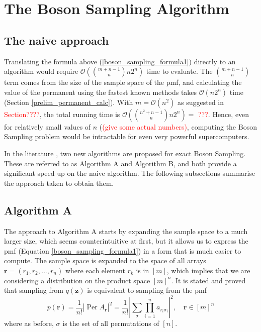 \documentclass[11pt]{article}
\theoremstyle{theorem}
\theoremstyle{remark}
\theoremstyle{plain}
\theoremstyle{definition}
\DeclareMathOperator*{\Per}{\mathrm{Per}}
\begin{document}
\section{The Boson Sampling Algorithm}
\subsection{The naive approach}
Translating the formula above (\ref{boson_sampling_formula1}) directly to an algorithm would require $\mathcal{O}(\binom{m+n-1}{n} n 2^n)$ time to evaluate. The $\binom{m+n-1}{n}$ term comes from the size of the sample space of the pmf, and calculating the value of the permanent using the fastest known methods takes $\mathcal{O}(n 2^n)$ time (Section \ref{prelim_permanent_calc}). With $m = \mathcal{O}(n^2)$ as suggested in \textcolor{red}{Section????}, the total running time is $\mathcal{O}(\binom{n^2+n-1}{n} n 2^n) = $ \textcolor{red}{???}. Hence, even for relatively small values of $n$ (\textcolor{red}{(give some actual numbers)}, computing the Boson Sampling problem would be intractable for even very powerful supercomputers.

In the literature \cite{clifford17}, two new algorithms are proposed for exact Boson Sampling. These are referred to as Algorithm A and Algorithm B, and both provide a significant speed up on the naive algorithm. The following subsections summarise the approach taken to obtain them.

\subsection{Algorithm A}
The approach to Algorithm A starts by expanding the sample space to a much larger size, which seems counterintuitive at first, but it allows us to express the pmf (Equation \ref{boson_sampling_formula1}) in a form that is much easier to compute. The sample space is expanded to the space of all arrays $\mathbf{r}=(r_1, r_2, ... , r_n)$ where each element $r_k$ is in $[m]$, which implies that we are considering a distribution on the product space $[m]^n$. It is stated and proved that sampling from $q(\mathbf{z})$ is equivalent to sampling from the pmf
\begin{equation} \label{eqn:algADistribution}
p(\mathbf{r}) = \frac{1}{n!} \left| \Per A_\mathbf{r} \right| ^2 = \frac{1}{n!} \left| \sum_\sigma \prod_{i=1}^n a_{r_i \sigma_i} \right| ^2 , \quad \mathbf{r} \in [m]^n 
\end{equation}
where as before, $\sigma$ is the set of all permutations of $[n]$.
\end{document}
